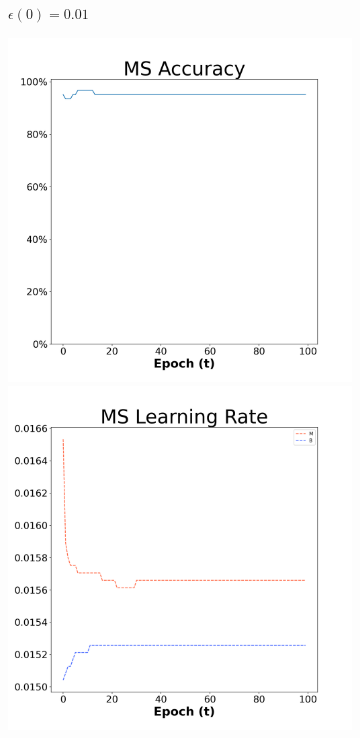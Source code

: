 \begin{figure}[H]
\begin{subfigure}{0.3\textwidth}
  \caption{$\epsilon(0)=0.01$}
\end{subfigure}\hfil %
\begin{subfigure}{0.3\textwidth}
  \includegraphics[width=\linewidth]{images/exper1/breast/MS_0.03_acc.png}
  \includegraphics[width=\linewidth]{images/exper1/breast/MS_0.03_lr.png}

\end{subfigure}
\end{figure}
